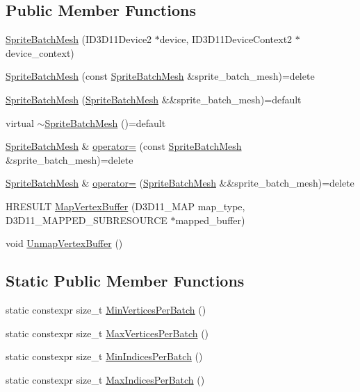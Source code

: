\subsection*{Public Member Functions}
\begin{DoxyCompactItemize}
\item 
\hyperlink{classmage_1_1_sprite_batch_mesh_a7664804b05d08b7126c3efedee5c2588}{Sprite\+Batch\+Mesh} (I\+D3\+D11\+Device2 $\ast$device, I\+D3\+D11\+Device\+Context2 $\ast$device\+\_\+context)
\item 
\hyperlink{classmage_1_1_sprite_batch_mesh_af86adf72834bd4a8b5b55af3e91bd339}{Sprite\+Batch\+Mesh} (const \hyperlink{classmage_1_1_sprite_batch_mesh}{Sprite\+Batch\+Mesh} \&sprite\+\_\+batch\+\_\+mesh)=delete
\item 
\hyperlink{classmage_1_1_sprite_batch_mesh_abbf8c76740e0f04eaabe5fe0790fe72c}{Sprite\+Batch\+Mesh} (\hyperlink{classmage_1_1_sprite_batch_mesh}{Sprite\+Batch\+Mesh} \&\&sprite\+\_\+batch\+\_\+mesh)=default
\item 
virtual \hyperlink{classmage_1_1_sprite_batch_mesh_aad8ae9446fd8f8159bb3531f31130032}{$\sim$\+Sprite\+Batch\+Mesh} ()=default
\item 
\hyperlink{classmage_1_1_sprite_batch_mesh}{Sprite\+Batch\+Mesh} \& \hyperlink{classmage_1_1_sprite_batch_mesh_ac6b9c2c79286f736d9a91a79cfa70044}{operator=} (const \hyperlink{classmage_1_1_sprite_batch_mesh}{Sprite\+Batch\+Mesh} \&sprite\+\_\+batch\+\_\+mesh)=delete
\item 
\hyperlink{classmage_1_1_sprite_batch_mesh}{Sprite\+Batch\+Mesh} \& \hyperlink{classmage_1_1_sprite_batch_mesh_a678700348ef43c46ed90d87d78c498de}{operator=} (\hyperlink{classmage_1_1_sprite_batch_mesh}{Sprite\+Batch\+Mesh} \&\&sprite\+\_\+batch\+\_\+mesh)=delete
\item 
H\+R\+E\+S\+U\+LT \hyperlink{classmage_1_1_sprite_batch_mesh_ab790dbbd3cb685c1f14d7ca1e9ed639b}{Map\+Vertex\+Buffer} (D3\+D11\+\_\+\+M\+AP map\+\_\+type, D3\+D11\+\_\+\+M\+A\+P\+P\+E\+D\+\_\+\+S\+U\+B\+R\+E\+S\+O\+U\+R\+CE $\ast$mapped\+\_\+buffer)
\item 
void \hyperlink{classmage_1_1_sprite_batch_mesh_a48ed983397a37a5874101b49c040b78c}{Unmap\+Vertex\+Buffer} ()
\end{DoxyCompactItemize}
\subsection*{Static Public Member Functions}
\begin{DoxyCompactItemize}
\item 
static constexpr size\+\_\+t \hyperlink{classmage_1_1_sprite_batch_mesh_a950ee2612c64733397fec4d03f12a531}{Min\+Vertices\+Per\+Batch} ()
\item 
static constexpr size\+\_\+t \hyperlink{classmage_1_1_sprite_batch_mesh_aa4253546e06f3faac0d8287d894a5655}{Max\+Vertices\+Per\+Batch} ()
\item 
static constexpr size\+\_\+t \hyperlink{classmage_1_1_sprite_batch_mesh_aca5b4cf24139e77ef1fcf54196d8e3ca}{Min\+Indices\+Per\+Batch} ()
\item 
static constexpr size\+\_\+t \hyperlink{classmage_1_1_sprite_batch_mesh_ad0957bf93f8d23916a4e25bd549b5127}{Max\+Indices\+Per\+Batch} ()
\end{DoxyCompactItemize}
